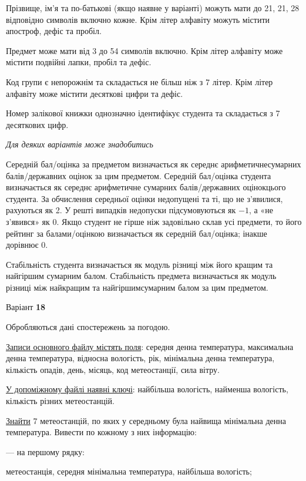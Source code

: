 \documentclass[11pt, ukrainian]{article}
\begin{document}
Прізвище, ім’я та по-батькові (якщо наявне у варіанті) можуть мати до 21, 21, 28 відповідно символів включно кожне. 
Крім літер алфавіту можуть містити апостроф, дефіс та пробіл.

Предмет може мати від 3 до 54 символів включно. 
Крім літер алфавіту може містити подвійні лапки, пробіл та дефіс.

Код групи є непорожнім та складається не більш ніж з 7 літер. 
Крім літер алфавіту може містити десяткові цифри та дефіс.


Номер залікової книжки однозначно ідентифікує студента та складається з 7 десяткових цифр. 

\bigskip\textit{Для деяких варіантів може знадобитись}

Середній бал/оцінка за предметом визначається як середнє арифметичнесумарних балів/державних оцінок за цим предметом. 
Середній бал/оцінка студента визначається як середнє арифметичне сумарних балів/державних оцінокцього студента. 
За обчислення середньої оцінки недопущені та ті, що не з’явилися, рахуються як 2.
У решті випадків недопуски підсумовуються як $-1$, а «не з’явився» як 0.
Якщо студент не гірше ніж задовільно склав усі предмети, 
то його рейтинг за балами/оцінкою визначається як середній бал/оцінка; інакше дорівнює 0.

Стабільність студента визначається як модуль різниці між його кращим та найгіршим сумарним балом.
Стабільність предмета визначається як модуль різниці між найкращим та найгіршимсумарним балом за цим предметом.






\par
\newpage
{\center Варіант  \No \textbf { 18 }\par}
\bigskip
Обробляються дані спостережень за погодою. 

\underline{Записи основного файлу містять поля}: середня денна температура, максимальна денна температура, відносна вологість, рік, мінімальна денна температура, кількість опадів, день, місяць, код метеостанції, сила вітру.

\underline{У допоміжному файлі наявні ключі}: найбільша вологість, найменша вологість, кількість різних метеостанцій.

\underline{Знайти} 7 метеостанцій, по яких у середньому була найвища мінімальна денна температура. Вивести по кожному з них інформацію:\par
{\noindent}--- на першому рядку:\par
метеостанція, середня мінімальна температура, найбільша вологість;
\end{document}
